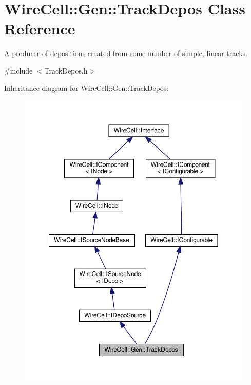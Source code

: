 \hypertarget{class_wire_cell_1_1_gen_1_1_track_depos}{}\section{Wire\+Cell\+:\+:Gen\+:\+:Track\+Depos Class Reference}
\label{class_wire_cell_1_1_gen_1_1_track_depos}


A producer of depositions created from some number of simple, linear tracks.  




{\ttfamily \#include $<$Track\+Depos.\+h$>$}



Inheritance diagram for Wire\+Cell\+:\+:Gen\+:\+:Track\+Depos\+:
\nopagebreak
\begin{figure}[H]
\begin{center}
\leavevmode
\includegraphics[width=350pt]{class_wire_cell_1_1_gen_1_1_track_depos__inherit__graph}
\end{center}
\end{figure}


